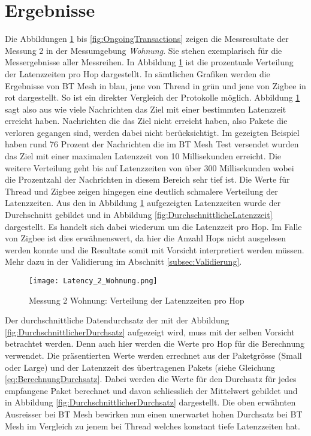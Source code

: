 \clearpage
\section{Ergebnisse}\label{sec:Ergebnisse}
Die Abbildungen \ref{fig:VerteilungderLatenzzeiten} bis \ref{fig:OngoingTransactions} zeigen die Messresultate der Messung 2 in der Messumgebung \textit{Wohnung}. Sie stehen exemplarisch für die Messergebnisse aller Messreihen.
In Abbildung \ref{fig:VerteilungderLatenzzeiten} ist die prozentuale Verteilung der Latenzzeiten pro Hop dargestellt.
In sämtlichen Grafiken werden die Ergebnisse von BT Mesh in blau, jene von Thread in grün und jene von Zigbee in rot dargestellt.
So ist ein direkter Vergleich der Protokolle möglich.
Abbildung \ref{fig:VerteilungderLatenzzeiten} sagt also aus wie viele Nachrichten das Ziel mit einer bestimmten Latenzzeit erreicht haben.
Nachrichten die das Ziel nicht erreicht haben, also Pakete die verloren gegangen sind, werden dabei nicht berücksichtigt.
Im gezeigten Beispiel haben rund 76 Prozent der Nachrichten die im BT Mesh Test versendet wurden das Ziel mit einer maximalen Latenzzeit von 10 Millisekunden erreicht.
Die weitere Verteilung geht bis auf Latenzzeiten von über 300 Millisekunden wobei die Prozentzahl der Nachrichten in diesem Bereich sehr tief ist.
Die Werte für Thread und Zigbee zeigen hingegen eine deutlich schmalere Verteilung der Latenzzeiten.
Aus den in Abbildung \ref{fig:VerteilungderLatenzzeiten} aufgezeigten Latenzzeiten wurde der Durchschnitt gebildet und in Abbildung \ref{fig:DurchschnittlicheLatenzzeit} dargestellt.
Es handelt sich dabei wiederum um die Latenzzeit pro Hop. Im Falle von Zigbee ist dies erwähnenswert, da hier die Anzahl Hops nicht ausgelesen werden konnte und die Resultate somit mit Vorsicht interpretiert werden müssen. Mehr dazu in der Validierung im Abschnitt \ref{subsec:Validierung}.

\begin{figure}[h]
	\centering
	\texttt{[image: Latency\_2\_Wohnung.png]}
	\caption{Messung 2 Wohnung: Verteilung der Latenzzeiten pro Hop}
	\label{fig:VerteilungderLatenzzeiten}
\end{figure}

Der durchschnittliche Datendurchsatz der mit der Abbildung \ref{fig:DurchschnittlicherDurchsatz} aufgezeigt wird, muss mit der selben Vorsicht betrachtet werden. Denn auch hier werden die Werte pro Hop für die Berechnung verwendet.
Die präsentierten Werte werden errechnet aus der Paketgrösse (Small oder Large) und der Latenzzeit des übertragenen Pakets (siehe Gleichung \ref{eq:BerechnungDurchsatz}.
Dabei werden die Werte für den Durchsatz für jedes empfangene Paket berechnet und davon schliesslich der Mittelwert gebildet und in Abbildung \ref{fig:DurchschnittlicherDurchsatz} dargestellt.
Die oben erwähnten Ausreisser bei BT Mesh bewirken nun einen unerwartet hohen Durchsatz bei BT Mesh im Vergleich zu jenem bei Thread welches konstant tiefe Latenzzeiten hat.

